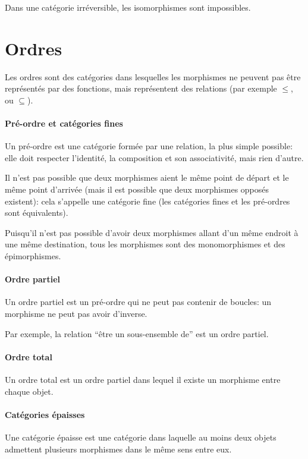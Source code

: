 \documentclass[a4paper,10pt,french,openany]{memoir}
\begin{document}
Dans une catégorie irréversible, les isomorphismes sont impossibles.

\section{Ordres}

Les ordres sont des catégories dans lesquelles les morphismes ne peuvent pas être représentés par des fonctions, mais représentent des relations (par exemple $\leq$, ou $\subseteq$).

\paragraph{Pré-ordre et catégories fines}
Un pré-ordre est une catégorie formée par une relation, la plus simple possible: elle doit respecter l'identité, la composition et son associativité, mais rien d'autre.

Il n'est pas possible que deux morphismes aient le même point de départ et le même point d'arrivée (mais il est possible que deux morphismes opposés existent): cela s'appelle une catégorie fine (les catégories fines et les pré-ordres sont équivalents).

Puisqu'il n'est pas possible d'avoir deux morphismes allant d'un même endroit à une même destination, tous les morphismes sont des monomorphismes et des épimorphismes.

\paragraph{Ordre partiel}
Un ordre partiel est un pré-ordre qui ne peut pas contenir de boucles: un morphisme ne peut pas avoir d'inverse.

Par exemple, la relation ``être un sous-ensemble de'' est un ordre partiel.

\paragraph{Ordre total}
Un ordre total est un ordre partiel dans lequel il existe un morphisme entre chaque objet.

\paragraph{Catégories épaisses}
Une catégorie épaisse est une catégorie dans laquelle au moins deux objets admettent plusieurs morphismes dans le même sens entre eux.
\end{document}
